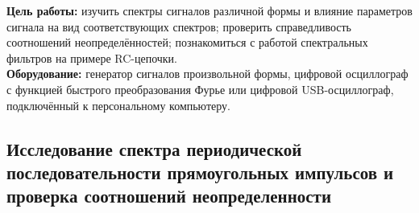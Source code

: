 \indent\textbf{Цель работы:} изучить спектры сигналов различной формы и влияние параметров сигнала на вид соответствующих спектров; проверить справедливость соотношений неопределённостей; познакомиться с работой спектральных фильтров на примере RC-цепочки.\\\indent
\textbf{Оборудование:} генератор сигналов произвольной формы, цифровой осциллограф с функцией быстрого преобразования Фурье или цифровой USB-осциллограф, подключённый к персональному компьютеру.\\
\subsection*{Исследование спектра периодической последовательности прямоугольных импульсов и проверка соотношений неопределенности}


